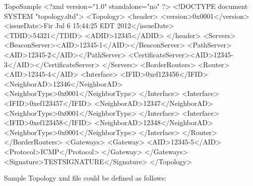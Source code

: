\begin{SaveVerbatim}{TopoSample}
<?xml version="1.0" standalone="no" ?>
<!DOCTYPE document SYSTEM "topology.dtd">
<Topology>
	<header>
		<version>0x0001</version>
		<issueDate>Fir Jul 6 15:44:25 EDT 2012</issueDate>
		<TDID>54321</TDID>
		<ADID>12345</ADID>
	</header>
	<Servers>
		<BeaconServer><AID>12345-1</AID></BeaconServer>
		<PathServer><AID>12345-2</AID></PathServer>
		<CertificateServer><AID>12345-3</AID></CertificateServer>
	</Servers>
	<BorderRouters>
		<Router>	
			<AID>12345-4</AID>
			<Interface>
				<IFID>0xef123456</IFID>
				<NeighborAD>12346</NeighborAD>
				<NeighborType>0x0001</NeighborType>
			</Interface>
			<Interface>
				<IFID>0xef123457</IFID>
				<NeighborAD>12347</NeighborAD>
				<NeighborType>0x0001</NeighborType>
			</Interface>
			<Interface>
				<IFID>0xef123458</IFID>
				<NeighborAD>12348</NeighborAD>
				<NeighborType>0x0001</NeighborType>
			</Interface>
		</Router>
	</BorderRouters>
	<Gateways>
		<Gateway>
			<AID>12345-5</AID>
			<Protocol>ICMP</Protocol>
		</Gateway>
	</Gateways>
	<Signature>TESTSIGNATURE</Signature>
</Topology>
\end{SaveVerbatim}

Sample Topology xml file could be defined as follows:

